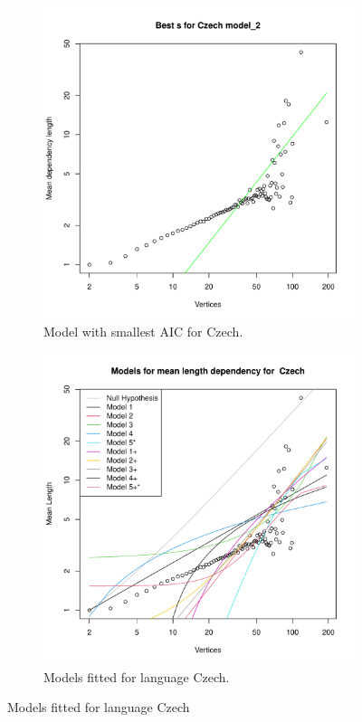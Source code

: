 \begin{figure}[!htb]
    \centering
    \begin{subfigure}{0.4\textwidth}
        \includegraphics[width=\textwidth]{figures/Czech_best_s.pdf}
        \caption{Model with smallest AIC for Czech.}
        \label{fig:czech_best_aic}
    \end{subfigure} \hfill
    \begin{subfigure}{0.4\textwidth}
        \includegraphics[width=\textwidth]{figures/Czech_all_models.pdf}
        \caption{Models fitted for language Czech.}
        \label{fig:czech_all}
    \end{subfigure}
    \caption{Models fitted for language Czech}
    \label{fig:czech}
\end{figure}

